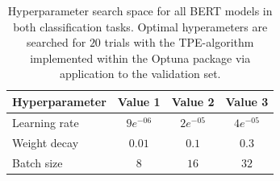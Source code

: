 \begin{table}[htbp]
\centering
\begin{tabular}{lccc}
\toprule
Hyperparameter & Value 1 & Value 2 & Value 3 \\
\midrule
Learning rate  & $9e^{-06}$ & $2e^{-05}$ & $4e^{-05}$ \\
Weight decay   & $0.01$ & $0.1$ & $0.3$ \\
Batch size     & $8$ & $16$ & $32$ \\
\bottomrule
\end{tabular}
\caption[Hyperparameter search space for all BERT models]{Hyperparameter search space for all BERT models in both classification tasks. Optimal hyperameters are searched for $20$ trials with the TPE-algorithm implemented within the Optuna package \parencite{akiba_optuna_2019} via application to the validation set.}
\label{tab:hyperparams_bert}
\end{table}